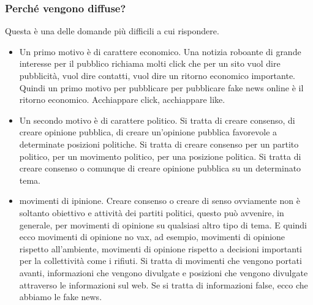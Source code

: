\subsubsection{Perché vengono diffuse?} 
Questa è una delle domande più difficili a cui rispondere.
\begin{itemize}
    \item Un primo motivo è di carattere economico. Una notizia roboante di grande interesse per il pubblico richiama molti click che per un sito vuol dire pubblicità, vuol dire contatti, vuol dire  un ritorno economico importante. Quindi un primo motivo per pubblicare per pubblicare fake news online è il ritorno economico. Acchiappare click, acchiappare like. 
    \item Un secondo motivo è di carattere politico. Si tratta di creare consenso, di creare opinione pubblica, di creare un'opinione pubblica favorevole a determinate posizioni politiche. Si tratta di creare consenso per un partito politico, per un movimento politico, per una posizione politica. Si tratta di creare consenso o comunque di creare opinione pubblica su un determinato tema.
    \item movimenti di ipinione. Creare consenso o creare di senso ovviamente non è soltanto obiettivo e attività dei partiti politici, questo può avvenire, in generale, per movimenti di opinione su qualsiasi altro tipo di tema. E quindi ecco movimenti di opinione no vax, ad esempio, movimenti di opinione rispetto all'ambiente, movimenti di opinione rispetto a decisioni importanti per la collettività come i rifiuti. Si tratta di movimenti che vengono portati avanti, informazioni che vengono divulgate e posizioni che vengono divulgate attraverso le informazioni sul web. Se si tratta di informazioni false, ecco che abbiamo le fake news.

\end{itemize}  

